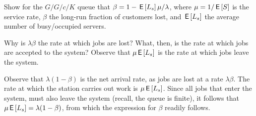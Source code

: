\begin{exercise}\label{ex:l-185}
  Show for the $G/G/c/K$ queue that $\beta = 1 - \,\mathsf{E}\left[L_s\right]\mu/ \lambda$, where $\mu=1/\,\mathsf{E}\left[S\right]$ is the service rate, $\beta$ the long-run fraction of customers lost, and $\,\mathsf{E}\left[L_s\right]$ the average number of busy/occupied servers.
\begin{hint}
  Why is $\lambda \beta$ the rate at which jobs are lost?
  What, then, is the rate at which jobs are accepted to the system?
  Observe that  $\mu \,\mathsf{E}\left[L_s\right]$ is the rate at which jobs leave the system.
\end{hint}
\begin{solution}
  Observe that $\lambda(1-\beta)$ is the net arrival rate, as jobs are lost at a rate $\lambda\beta$.
  The rate at which the station carries out work is $\mu \,\mathsf{E}\left[L_s\right]$.
  Since all jobs that enter the system, must also leave the system (recall, the queue is finite), it follows that $\mu \,\mathsf{E}\left[L_s\right] = \lambda(1-\beta)$, from which the expression for $\beta$ readily follows.
\end{solution}
\end{exercise}



